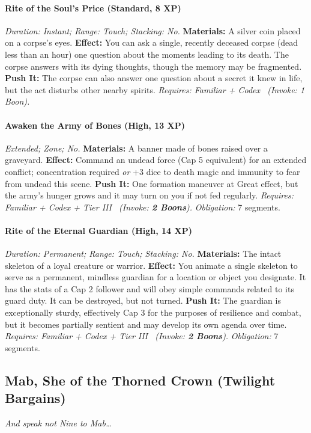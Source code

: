 \paragraph{Rite of the Soul's Price (Standard, 8 XP)} \emph{Duration: Instant; Range: Touch; Stacking: No.}
\textbf{Materials:} A silver coin placed on a corpse's eyes.
\textbf{Effect:} You can ask a single, recently deceased corpse (dead less than an hour) one question about the moments leading to its death. The corpse answers with its dying thoughts, though the memory may be fragmented.
\textbf{Push It:} The corpse can also answer one question about a secret it knew in life, but the act disturbs other nearby spirits.
\emph{Requires: Familiar + Codex \ (\textit{Invoke:} 1 Boon).}
\paragraph{Awaken the Army of Bones (High, 13 XP)} \emph{Extended; Zone; No.}
\textbf{Materials:} A banner made of bones raised over a graveyard.
\textbf{Effect:} Command an undead force (Cap 5 equivalent) for an extended conflict; concentration required \emph{or} +3 dice to death magic and immunity to fear from undead this scene.
\textbf{Push It:} One formation maneuver at Great effect, but the army's hunger grows and it may turn on you if not fed regularly.
\emph{Requires: Familiar + Codex + Tier III \ (\textit{Invoke:} \textbf{2 Boons}).}
\emph{Obligation:} 7 segments.

\paragraph{Rite of the Eternal Guardian (High, 14 XP)} \emph{Duration: Permanent; Range: Touch; Stacking: No.}
\textbf{Materials:} The intact skeleton of a loyal creature or warrior.
\textbf{Effect:} You animate a single skeleton to serve as a permanent, mindless guardian for a location or object you designate. It has the stats of a Cap 2 follower and will obey simple commands related to its guard duty. It can be destroyed, but not turned.
\textbf{Push It:} The guardian is exceptionally sturdy, effectively Cap 3 for the purposes of resilience and combat, but it becomes partially sentient and may develop its own agenda over time.
\emph{Requires: Familiar + Codex + Tier III \ (\textit{Invoke:} \textbf{2 Boons}).}
\emph{Obligation:} 7 segments.

\subsection{Mab, She of the Thorned Crown (Twilight Bargains)}
\textit{And speak not Nine to Mab\dots}
